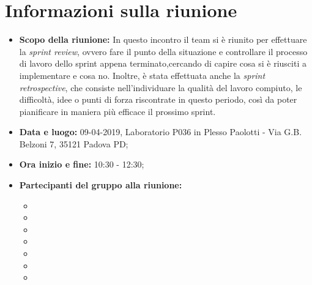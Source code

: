 \clearpage
\section{Informazioni sulla riunione}
\begin{itemize}
	\item \textbf {Scopo della riunione:} In questo incontro il team si è riunito per effettuare la \textit{sprint review}, ovvero fare il punto della situazione e controllare il processo di lavoro dello sprint appena terminato,cercando di capire cosa si è riusciti a implementare e cosa no. Inoltre, è stata effettuata anche la \textit{sprint retrospective}, che consiste nell'individuare la qualità del lavoro compiuto, le difficoltà, idee o punti di forza riscontrate in questo periodo, così da poter pianificare in maniera più efficace il prossimo sprint.
	\item \textbf {Data e luogo:} 09-04-2019, Laboratorio P036 in Plesso Paolotti - Via G.B. Belzoni 7, 35121 Padova PD;
	\item \textbf {Ora inizio e fine:} 10:30 - 12:30;
	\item \textbf {Partecipanti del gruppo alla riunione:} 
		 \begin{itemize}
			\item \sonia
			\item \pardeep
			\item \luca
			\item \matteo
			\item \alberto
			\item \alessandro
			\item \andrea
		\end{itemize}
\end{itemize}